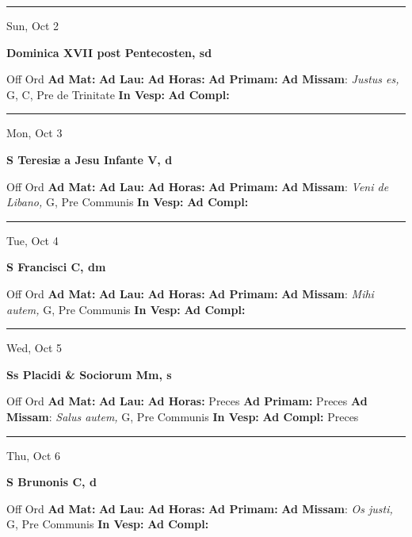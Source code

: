 \documentclass[letterpaper, 10pt]{article}
\begin{document}
\hrule
\begin{center}
Sun, Oct 2
\end{center}\textbf{ \large Dominica XVII post Pentecosten, \textnormal{\normalsize sd}}
\begin{justify}
Off Ord
\textbf{Ad Mat: }
\textbf{Ad Lau: }
\textbf{Ad Horas: }
\textbf{Ad Primam: }
\textbf{Ad Missam}: \textit{Justus es,} G, C, Pre de Trinitate
\textbf{In Vesp: }
\textbf{Ad Compl: }\end{justify}



\hrule
\begin{center}
Mon, Oct 3
\end{center}\textbf{ \large S Teresiæ a Jesu Infante V, \textnormal{\normalsize d}}
\begin{justify}
Off Ord
\textbf{Ad Mat: }
\textbf{Ad Lau: }
\textbf{Ad Horas: }
\textbf{Ad Primam: }
\textbf{Ad Missam}: \textit{Veni de Libano,} G, Pre Communis
\textbf{In Vesp: }
\textbf{Ad Compl: }\end{justify}



\hrule
\begin{center}
Tue, Oct 4
\end{center}\textbf{ \large S Francisci C, \textnormal{\normalsize dm}}
\begin{justify}
Off Ord
\textbf{Ad Mat: }
\textbf{Ad Lau: }
\textbf{Ad Horas: }
\textbf{Ad Primam: }
\textbf{Ad Missam}: \textit{Mihi autem,} G, Pre Communis
\textbf{In Vesp: }
\textbf{Ad Compl: }\end{justify}



\hrule
\begin{center}
Wed, Oct 5
\end{center}\textbf{ \large Ss Placidi \& Sociorum Mm, \textnormal{\normalsize s}}
\begin{justify}
Off Ord
\textbf{Ad Mat: }
\textbf{Ad Lau: }
\textbf{Ad Horas: }Preces
\textbf{Ad Primam: }Preces
\textbf{Ad Missam}: \textit{Salus autem,} G, Pre Communis
\textbf{In Vesp: }
\textbf{Ad Compl: }Preces\end{justify}



\hrule
\begin{center}
Thu, Oct 6
\end{center}\textbf{ \large S Brunonis C, \textnormal{\normalsize d}}
\begin{justify}
Off Ord
\textbf{Ad Mat: }
\textbf{Ad Lau: }
\textbf{Ad Horas: }
\textbf{Ad Primam: }
\textbf{Ad Missam}: \textit{Os justi,} G, Pre Communis
\textbf{In Vesp: }
\textbf{Ad Compl: }\end{justify}
\end{document}
